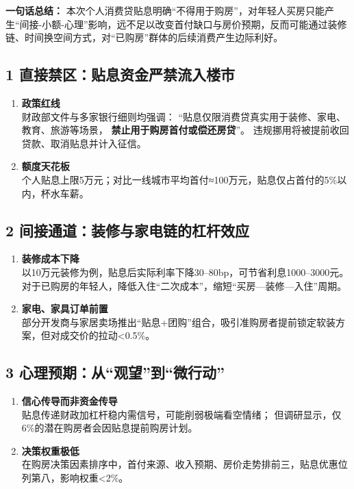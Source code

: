 \textbf{一句话总结：}  
本次个人消费贷贴息明确“不得用于购房”，对年轻人买房只能产生“间接-小额-心理”影响，远不足以改变首付缺口与房价预期，反而可能通过装修链、时间换空间方式，对“已购房”群体的后续消费产生边际利好。

\subsection{1 直接禁区：贴息资金严禁流入楼市}
\begin{enumerate}[leftmargin=*, nosep]
  \item \textbf{政策红线}  \\
  财政部文件与多家银行细则均强调：  
  “贴息仅限消费贷真实用于装修、家电、教育、旅游等场景， \textbf{禁止用于购房首付或偿还房贷}”。  
  违规挪用将被提前收回贷款、取消贴息并计入征信。
  \item \textbf{额度天花板}  \\
  个人贴息上限5万元；对比一线城市平均首付≈100万元，贴息仅占首付的5\%以内，杯水车薪。
\end{enumerate}

\subsection{2 间接通道：装修与家电链的杠杆效应}
\begin{enumerate}[leftmargin=*, nosep]
  \item \textbf{装修成本下降}  \\
  以10万元装修为例，贴息后实际利率下降30–80bp，可节省利息1000–3000元。  
  对于已购房的年轻人，降低入住“二次成本”，缩短“买房—装修—入住”周期。
  \item \textbf{家电、家具订单前置}  \\
  部分开发商与家居卖场推出“贴息+团购”组合，吸引准购房者提前锁定软装方案，但对成交价的拉动<0.5\%。
\end{enumerate}

\subsection{3 心理预期：从“观望”到“微行动”}
\begin{enumerate}[leftmargin=*, nosep]
  \item \textbf{信心传导而非资金传导}  \\
  贴息传递财政加杠杆稳内需信号，可能削弱极端看空情绪；  
  但调研显示，仅6\%的潜在购房者会因贴息提前购房计划。
  \item \textbf{决策权重极低}  \\
  在购房决策因素排序中，首付来源、收入预期、房价走势排前三，贴息优惠位列第八，影响权重<2\%。
\end{enumerate}

